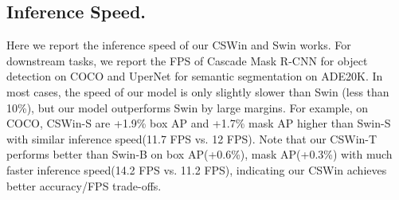 \documentclass[10pt,twocolumn,letterpaper]{article}
\begin{document}
\begin{table*}[t]
\centering
{}

\vspace{-3mm}
\caption{Stripes-Based attention mechanism comparison. `Seq' means sequential multi-head attention like Axial-attention. `Attention Region' means the average number of tokens that each head calculates attention with.}
\label{tab:ccnet_comp}
\vspace{-3mm}
\end{table*}


\subsection{Inference Speed.}
Here we report the inference speed of our CSWin and Swin works. For downstream tasks, we report the FPS of Cascade Mask R-CNN for object detection on COCO and UperNet for semantic segmentation on ADE20K.
In most cases, the speed of our model is only slightly slower than Swin (less than 10\%), but our model outperforms Swin by large margins. For example, on COCO, CSWin-S are +1.9\% box AP and +1.7\% mask AP higher than Swin-S with similar inference speed(11.7 FPS vs. 12 FPS). Note that our CSWin-T performs better than Swin-B on box AP(+0.6\%), mask AP(+0.3\%) with much faster inference speed(14.2 FPS vs. 11.2 FPS), indicating our CSWin achieves better accuracy/FPS trade-offs.
\end{document}
